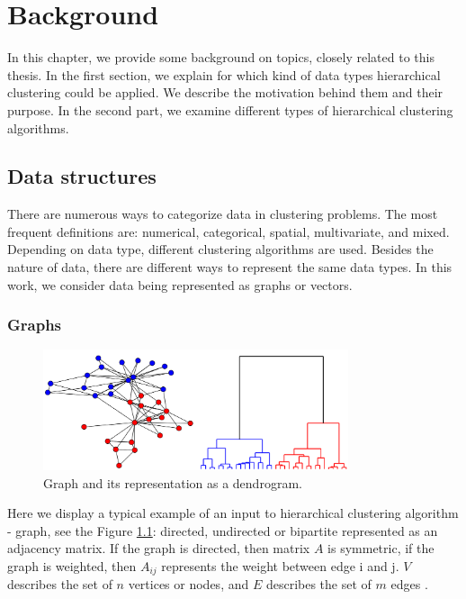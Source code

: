 \chapter{Background}
\label{background}

In this chapter, we provide some background on topics, closely related to this thesis.
In the first section, we explain for which kind of data types hierarchical clustering could be applied. 
We describe the motivation behind them and their purpose. 
In the second part, we examine different types of hierarchical clustering algorithms.

\section{Data structures}
There are numerous ways to categorize data in clustering problems. 
The most frequent definitions are: numerical, categorical, spatial, multivariate, and mixed. 
Depending on data type, different clustering algorithms are used. 
Besides the nature of data, there are different ways to represent the same data types. 
In this work, we consider data being represented as graphs or vectors.

\subsection{Graphs}
\begin{figure}[t]
    \includegraphics[width=0.8\textwidth,keepaspectratio=true]{figures/Karate_club.png} 
    \centering
    \caption{Graph and its representation as a dendrogram.}
    \label{fig:graph_example}
\end{figure}

Here we display a typical example of an input to hierarchical clustering algorithm - graph, see the Figure \ref{fig:graph_example}: 
directed, undirected or bipartite represented as an adjacency matrix. If the graph is directed, 
then matrix $A$ is symmetric, if the graph is weighted, then $A_{ij}$ represents the weight between edge i and j. 
$V$ describes the set of $n$ vertices or nodes, and $E$ describes the set of $m$ edges \cite{Bonald2018}.

